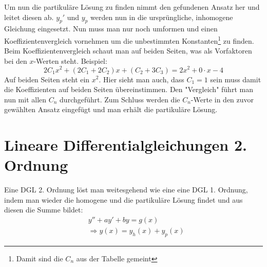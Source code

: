 \documentclass[a4paper,10pt]{scrartcl}
\begin{document}
        Um nun die partikuläre Lösung zu finden nimmt den gefundenen Ansatz her und leitet diesen ab. \(y_p'\) und \(y_p\) werden nun in die ursprüngliche, inhomogene
        Gleichung eingesetzt. Nun muss man nur noch umformen und einen Koeffizientenvergleich vornehmen um die unbestimmten Konstanten\footnote{Damit sind die \(C_n\) aus der Tabelle gemeint} zu finden. \\
        Beim Koeffizientenvergleich schaut man auf beiden Seiten, was als Vorfaktoren bei den \(x\)-Werten steht. Beispiel: 
        \begin{equation*}
            2C_1x^2 + (2C_1 + 2C_2)x + (C_2+ 3C_3) = 2x^2 + 0 \cdot x - 4 
        \end{equation*}
        Auf beiden Seiten steht ein \(x^2\). Hier sieht man auch, dass \(C_1 = 1\) sein muss damit die Koeffizienten auf beiden Seiten übereinstimmen. Den "Vergleich" führt man 
        nun mit allen \(C_n\) durchgeführt. Zum Schluss werden die \(C_n\)-Werte in den zuvor gewählten Ansatz eingefügt und man erhält die partikuläre Lösung.  
    \section{Lineare Differentialgleichungen 2. Ordnung}
        Eine DGL 2. Ordnung löst man weitesgehend wie eine eine DGL 1. Ordnung, indem man wieder die homogene und die partikuläre Lösung findet und aus diesen  die Summe bildet:
        \begin{equation}
            \begin{aligned}
                & y'' + ay' + by = g(x) \\
                & \Rightarrow y(x) = y_h(x) + y_p(x) 
            \end{aligned}
        \end{equation}   
\end{document}
